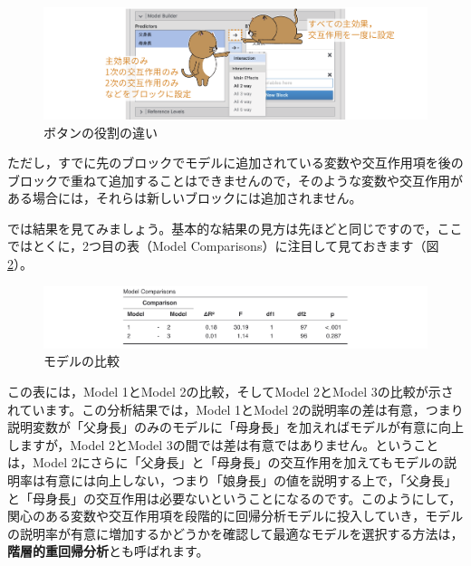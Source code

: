 \documentclass[
  12pt,
  a5jpaper,
  lualatex, ja=standard]{bxjsbook}
\renewcommand{\emph}[1]{\textbf{\color{emph} #1}}
\begin{document}
\begin{figure}[!ht]

{\centering \includegraphics[width=1\linewidth]{images/regression/lr-model-builder-arrow-buttons} 

}

\caption{ボタンの役割の違い}\label{fig:regression-lr-model-builder-arrow-buttons}
\end{figure}

ただし，すでに先のブロックでモデルに追加されている変数や交互作用項を後のブロックで重ねて追加することはできませんので，そのような変数や交互作用がある場合には，それらは新しいブロックには追加されません。

では結果を見てみましょう。基本的な結果の見方は先ほどと同じですので，ここではとくに，2つ目の表（Model Comparisons）に注目して見ておきます（図\ref{fig:regression-lr-model-builder-result2}）。

\begin{figure}[!ht]

{\centering \includegraphics[width=1\linewidth]{images/regression/lr-model-builder-result2} 

}

\caption{モデルの比較}\label{fig:regression-lr-model-builder-result2}
\end{figure}

この表には，Model 1とModel 2の比較，そしてModel 2とModel 3の比較が示されています。この分析結果では，Model 1とModel 2の説明率の差は有意，つまり説明変数が「父身長」のみのモデルに「母身長」を加えればモデルが有意に向上しますが，Model 2とModel 3の間では差は有意ではありません。ということは，Model 2にさらに「父身長」と「母身長」の交互作用を加えてもモデルの説明率は有意には向上しない，つまり「娘身長」の値を説明する上で，「父身長」と「母身長」の交互作用は必要ないということになるのです。このようにして，関心のある変数や交互作用項を段階的に回帰分析モデルに投入していき，モデルの説明率が有意に増加するかどうかを確認して最適なモデルを選択する方法は，\emph{階層的重回帰分析}とも呼ばれます。
\end{document}
